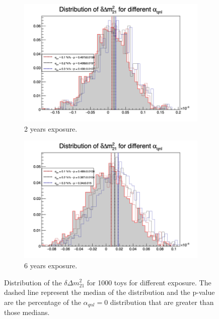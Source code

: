 \documentclass[../main.tex]{subfiles}
\begin{document}
\begin{figure}[th]
  \begin{subfigure}[t]{0.48\linewidth}
    \includegraphics[width=\linewidth]{images/joint_fit/stat_tests/chi2_delta_m_2y.png}
    \caption{2 years exposure.}
  \end{subfigure}
  \begin{subfigure}[t]{0.48\linewidth}
    \includegraphics[width=\linewidth]{images/joint_fit/stat_tests/chi2_delta_m_6y.png}
    \caption{6 years exposure.}
  \end{subfigure}
  \caption{Distribution of the $\delta \Delta m^2_{21}$ for 1000 toys for different exposure. The dashed line represent the median of the distribution and the p-value are the percentage of the $\alpha_{qnl} = 0$ distribution that are greater than those medians.}
  \label{fig:joint_fit:chi2_delta_m}
\end{figure}
\end{document}
